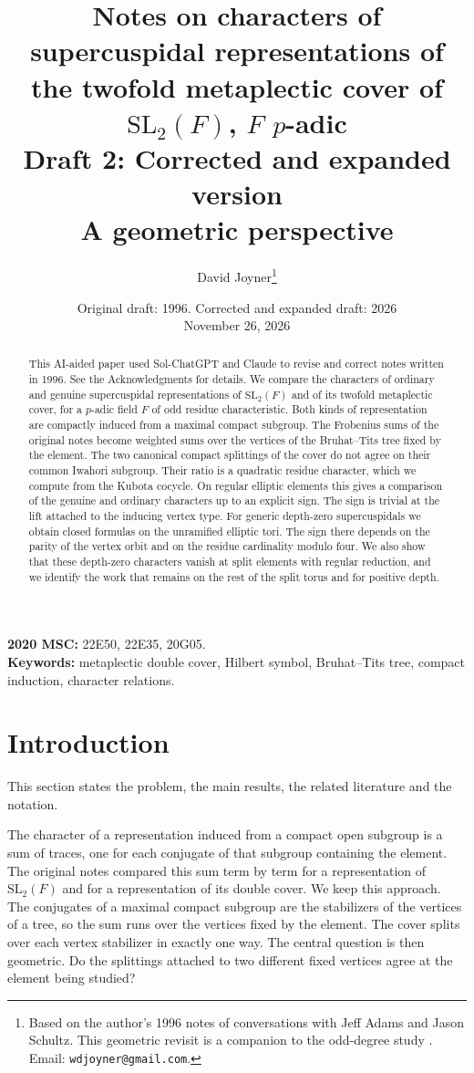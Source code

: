 \documentclass[12pt,letterpaper]{article}
\title{Notes on characters of supercuspidal representations of the twofold metaplectic cover of $\mathrm{SL}_2(F)$, $F$ $p$-adic\\[.5ex]\large Draft 2: Corrected and expanded version\\A geometric perspective}
\author{David Joyner\thanks{Based on the author's 1996 notes of conversations with Jeff Adams and Jason Schultz. This geometric revisit is a companion to the odd-degree study \cite{Jo26}. Email: \texttt{wdjoyner@gmail.com}.}}
\date{Original draft: 1996. Corrected and expanded draft: 2026\\November 26, 2026}
\numberwithin{equation}{section}
\theoremstyle{definition}
\theoremstyle{remark}
\begin{document}
\maketitle
\begin{abstract}
This AI-aided paper used Sol-ChatGPT and Claude to revise and correct notes written in 1996. See the Acknowledgments for details. We compare the characters of ordinary and genuine supercuspidal representations of $\mathrm{SL}_2(F)$ and of its twofold metaplectic cover, for a $p$-adic field $F$ of odd residue characteristic. Both kinds of representation are compactly induced from a maximal compact subgroup. The Frobenius sums of the original notes become weighted sums over the vertices of the Bruhat--Tits tree fixed by the element. The two canonical compact splittings of the cover do not agree on their common Iwahori subgroup. Their ratio is a quadratic residue character, which we compute from the Kubota cocycle. On regular elliptic elements this gives a comparison of the genuine and ordinary characters up to an explicit sign. The sign is trivial at the lift attached to the inducing vertex type. For generic depth-zero supercuspidals we obtain closed formulas on the unramified elliptic tori. The sign there depends on the parity of the vertex orbit and on the residue cardinality modulo four. We also show that these depth-zero characters vanish at split elements with regular reduction, and we identify the work that remains on the rest of the split torus and for positive depth.
\end{abstract}
\noindent\textbf{2020 MSC:} 22E50, 22E35, 20G05.\\
\textbf{Keywords:} metaplectic double cover, Hilbert symbol, Bruhat--Tits tree, compact induction, character relations.
\tableofcontents

\section{Introduction}\label{sec:intro}
This section states the problem, the main results, the related literature and the notation.

The character of a representation induced from a compact open subgroup is a sum of traces, one for each conjugate of that subgroup containing the element. The original notes compared this sum term by term for a representation of $\mathrm{SL}_2(F)$ and for a representation of its double cover. We keep this approach. The conjugates of a maximal compact subgroup are the stabilizers of the vertices of a tree, so the sum runs over the vertices fixed by the element. The cover splits over each vertex stabilizer in exactly one way. The central question is then geometric. Do the splittings attached to two different fixed vertices agree at the element being studied?
\end{document}
